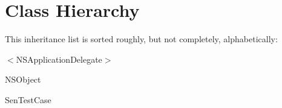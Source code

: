 \section{Class Hierarchy}
This inheritance list is sorted roughly, but not completely, alphabetically\-:\begin{DoxyCompactList}
\item $<$N\-S\-Application\-Delegate$>$\begin{DoxyCompactList}
\item {}
\end{DoxyCompactList}
\item N\-S\-Object\begin{DoxyCompactList}
\item {}
\end{DoxyCompactList}
\item Sen\-Test\-Case\begin{DoxyCompactList}
\item {}
\end{DoxyCompactList}
\end{DoxyCompactList}
